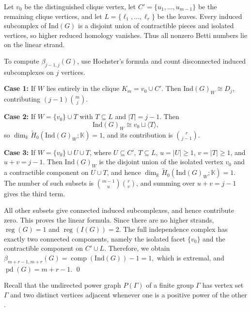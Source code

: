 \documentclass[12pt]{article}
\renewenvironment{proof}{{\bf \noindent Proof.}}{\qed}
\theoremstyle{definition}
\theoremstyle{remark}
\DeclareMathOperator{\reg}{reg}
\DeclareMathOperator{\pd}{pd}
\DeclareMathOperator{\comp}{comp}
\newcommand{\kk}{\mathbb{K}}
\newcommand{\ind}{\mathrm{Ind}}
\newcommand{\wt}{\widetilde}
\begin{document}
	\begin{proof}
		Let $v_0$ be the distinguished clique vertex, let $C'=\{u_1,\dots,u_{m-1}\}$ be the remaining clique vertices, and let $L=\{\ell_1,\dots,\ell_r\}$ be the leaves. Every induced subcomplex of $\ind(G)$ is a disjoint union of contractible pieces and isolated vertices, so higher reduced homology vanishes. Thus all nonzero Betti numbers lie on the linear strand.
		
		To compute $\beta_{j-1,j}(G)$, use Hochster's formula and count disconnected induced subcomplexes on $j$ vertices.
		
		\smallskip
		
		\noindent\textbf{Case 1:} If $W$ lies entirely in the clique $K_m={v_0}\cup C'$. Then $\ind(G)_W\cong D_j$, contributing $(j-1)\binom{m}{j}$.
		
		\smallskip
		
		\noindent\textbf{Case 2:} If $W=\{v_0\}\cup T$ with $T\subseteq L$ and $|T|=j-1$. Then
		$$
		\ind(G)_W\cong {v_0}\sqcup \langle T\rangle,
		$$
		so $\dim_{\kk}\wt H_0(\ind(G)_W;\kk)=1$, and its contribution is $\binom{r}{j-1}$.
		
		\smallskip
		
		\noindent\textbf{Case 3:} If $W=\{v_0\}\cup U\cup T$, where $U\subseteq C'$, $T\subseteq L$, $u=|U|\geq 1$, $v=|T|\geq 1$, and $u+v=j-1$. Then $\ind(G)_W$ is the disjoint union of the isolated vertex ${v_0}$ and a contractible component on $U\cup T$, and  hence $\dim_{\kk}\wt H_0(\ind(G)_W;\kk)=1$. The number of such subsets is $\binom{m-1}{u}\binom{r}{v}$, and summing over $u+v=j-1$ gives the third term.
		
		\smallskip
		
		All other subsets give connected induced subcomplexes, and hence contribute zero. This proves the linear formula. Since there are no higher strands, $\reg(G)=1$ and $\reg(I(G))=2$. The full independence complex has exactly two connected components, namely the isolated facet $\{v_0\}$ and the contractible component on $C'\cup L$. Therefore, we obtain 
		$ \beta_{m+r-1,m+r}(G)=\comp(\ind(G))-1=1, $
		which is extremal, and $\pd(G)=m+r-1$.
	\end{proof}
	
	\medskip
	
	Recall that the undirected power graph $P(\Gamma)$ of a finite group $\Gamma$ has vertex set $\Gamma$ and two distinct vertices adjacent whenever one is a positive power of the other \cite{ChakrabartyGhoshSen2009,AbawajyKelarevChowdhury2013}.
	
\end{document}
